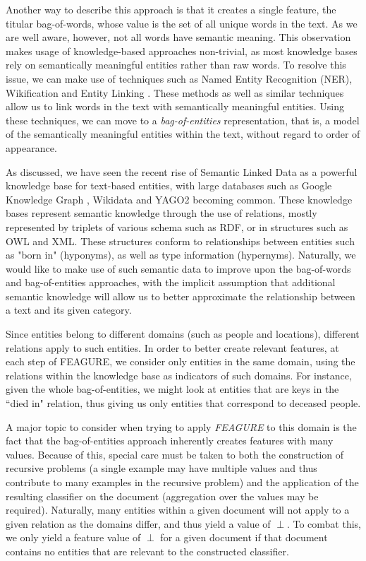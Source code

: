 \documentclass[twoside,11pt]{article}
\theoremstyle{definition}
\begin{document}
Another way to describe this approach is that it creates a single feature, the titular bag-of-words, whose value is the set of all unique words in the text.
As we are well aware, however, not all words have semantic meaning. This observation makes usage of knowledge-based approaches non-trivial, as most knowledge bases rely on semantically meaningful entities rather than raw words.
To resolve this issue, we can make use of techniques such as Named Entity Recognition (NER), Wikification \cite{bunescu2006using} and Entity Linking \cite{rao2013entity}. These methods as well as similar techniques allow us to link words in the text with semantically meaningful entities. 
Using these techniques, we can move to a \emph{bag-of-entities} representation, that is, a model of the semantically meaningful entities within the text, without regard to order of appearance.

As discussed, we have seen the recent rise of Semantic Linked Data as a powerful knowledge base for text-based entities, with large databases such as Google Knowledge Graph \cite{pelikanova2014google}, Wikidata \cite{vrandevcic2014wikidata} and YAGO2 \cite{hoffart2013yago2} becoming common. 
These knowledge bases represent semantic knowledge through the use of relations, mostly represented by triplets of various schema such as RDF, or in structures such as OWL and XML. These structures conform to relationships between entities such as "born in" (hyponyms), as well as type information (hypernyms).
Naturally, we would like to make use of such semantic data to improve upon the bag-of-words and bag-of-entities approaches, with the implicit assumption that additional semantic knowledge will allow us to better approximate the relationship between a text and its given category.

Since entities belong to different domains (such as people and locations), different relations apply to such entities. In order to better create relevant features, at each step of FEAGURE, we consider only entities in the same domain, using the relations within the knowledge base as indicators of such domains. For instance, given the whole bag-of-entities, we might look at entities that are keys in the ``died in" relation, thus giving us only entities that correspond to deceased people.

A major topic to consider when trying to apply \emph{FEAGURE} to this domain is the fact that the bag-of-entities approach inherently creates features with many values. Because of this, special care must be taken to both the construction of recursive problems (a single example may have multiple values and thus contribute to many examples in the recursive problem) and the application of the resulting classifier on the document (aggregation over the values may be required).
Naturally, many entities within a given document will not apply to a given relation as the domains differ, and thus yield a value of $\perp$. To combat this, we only yield a feature value of $\perp$ for a given document if that document contains no entities that are relevant to the constructed classifier.
\end{document}
